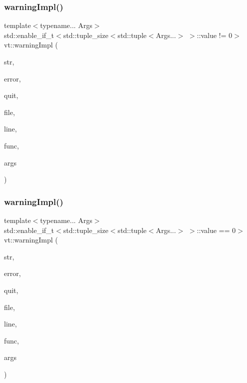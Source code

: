 \subsubsection{\texorpdfstring{warning\+Impl()}{warningImpl()}\hspace{0.1cm}{\footnotesize\ttfamily [1/2]}}
{\footnotesize\ttfamily template$<$typename... Args$>$ \\
std\+::enable\+\_\+if\+\_\+t$<$std\+::tuple\+\_\+size$<$std\+::tuple$<$Args...$>$ $>$\+::value != 0$>$ vt\+::warning\+Impl (\begin{DoxyParamCaption}\item[{std\+::string const \&}]{str,  }\item[{\hyperlink{namespacevt_a793764d753923abc3d32929870beb485}{Error\+Code\+Type}}]{error,  }\item[{bool}]{quit,  }\item[{std\+::string const \&}]{file,  }\item[{int const}]{line,  }\item[{std\+::string const \&}]{func,  }\item[{Args \&\&...}]{args }\end{DoxyParamCaption})\hspace{0.3cm}{\ttfamily [inline]}}

\mbox{\label{namespacevt_a118ef4729cf1e1516a3efef8da49efbf}} 
\subsubsection{\texorpdfstring{warning\+Impl()}{warningImpl()}\hspace{0.1cm}{\footnotesize\ttfamily [2/2]}}
{\footnotesize\ttfamily template$<$typename... Args$>$ \\
std\+::enable\+\_\+if\+\_\+t$<$std\+::tuple\+\_\+size$<$std\+::tuple$<$Args...$>$ $>$\+::value == 0$>$ vt\+::warning\+Impl (\begin{DoxyParamCaption}\item[{std\+::string const \&}]{str,  }\item[{\hyperlink{namespacevt_a793764d753923abc3d32929870beb485}{Error\+Code\+Type}}]{error,  }\item[{bool}]{quit,  }\item[{std\+::string const \&}]{file,  }\item[{int const}]{line,  }\item[{std\+::string const \&}]{func,  }\item[{Args \&\&...}]{args }\end{DoxyParamCaption})\hspace{0.3cm}{\ttfamily [inline]}}

